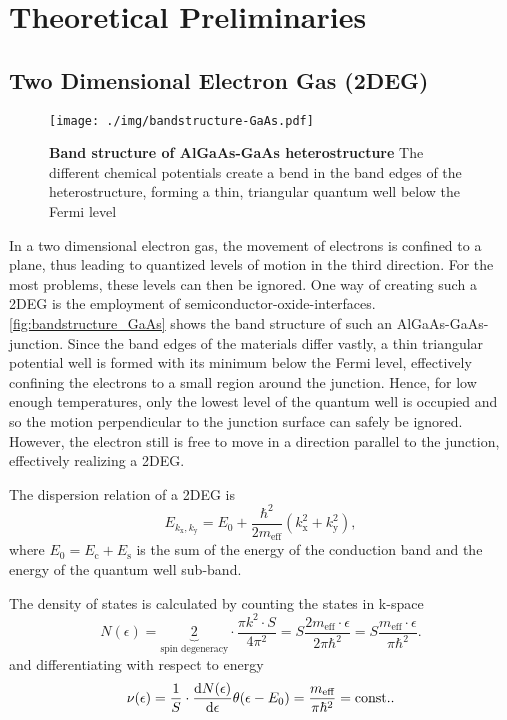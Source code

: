 \chapter{Theoretical Preliminaries}

\section{Two Dimensional Electron Gas (2DEG)}
\begin{figure}
	\centering
	\texttt{[image: ./img/bandstructure-GaAs.pdf]}
	\caption[Band structure of AlGaAs-GaAs heterostructure]{\textbf{Band structure of AlGaAs-GaAs heterostructure} The different chemical potentials create a bend in the band edges of the heterostructure, forming a thin, triangular quantum well below the Fermi level}
	\label{fig:bandstructure_GaAs}
\end{figure}
In a two dimensional electron gas, the movement of electrons is confined to a plane, thus leading to quantized levels of motion in the third direction.
For the most problems, these levels can then be ignored.
One way of creating such a 2DEG is the employment of semiconductor-oxide-interfaces.
\autoref{fig:bandstructure_GaAs} shows the band structure of such an AlGaAs-GaAs-junction.
Since the band edges of the materials differ vastly, a thin triangular potential well is formed with its minimum below the Fermi level, effectively confining the electrons to a small region around the junction.
Hence, for low enough temperatures, only the lowest level of the quantum well is occupied and so the motion perpendicular to the junction surface can safely be ignored.
However, the electron still is free to move in a direction parallel to the junction, effectively realizing a 2DEG.

The dispersion relation of a 2DEG is
\begin{equation}\label{eq:subband}
	E_{k_\text{x}, k_\text{y}} = E_0 + \frac{\hbar^2}{2m_\text{eff}}\left(k_\text{x}^2 + k_\text{y}^2\right),
\end{equation}
where $E_0=E_\text{c} + E_\text{s}$ is the sum of the energy of the conduction band and the energy of the quantum well sub-band.

The density of states is calculated by counting the states in k-space
\begin{equation*}
	N(\epsilon) = \underbrace{2}_{\text{spin degeneracy}}\cdot\frac{\pi k^2\cdot S}{4\pi^2} = S\frac{2m_\text{eff}\cdot\epsilon}{2\pi\hbar^2} = S\frac{m_\text{eff}\cdot\epsilon}{\pi\hbar^2}.
\end{equation*}
and differentiating with respect to energy
\begin{equation*}
	\nu(\epsilon) = \frac{1}{S}\cdot\diff[N(\epsilon)]{\epsilon}\theta(\epsilon-E_0) = \frac{m_\text{eff}}{\pi\hbar^2} = \text{const.}.
\end{equation*}

